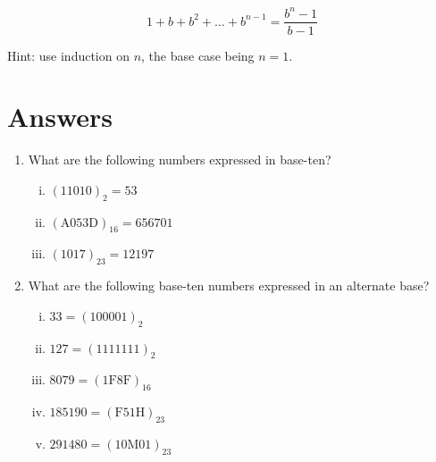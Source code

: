 \documentclass{article}
\begin{document}
\begin{enumerate}
\[1+b+b^2+\dots+b^{n-1} = \frac{b^n-1}{b-1}\]

Hint: use induction on $n$, the base case being $n=1$.

\end{enumerate}

\section*{Answers}
\begin{enumerate}
\item What are the following numbers expressed in base-ten?
\begin{enumerate}[i)]
\item $(11010)_2 = 53$
\item $(\text{A}053\text{D})_{16}=656701$
\item $(1017)_{23} = 12197$
\end{enumerate}
\item What are the following base-ten numbers expressed in an alternate base?
\begin{enumerate}[i)]
\item $33 = (100001)_2$
\item $127 = (1111111)_2$
\item $8079 = (1\text{F}8\text{F})_{16}$
\item $185190 = (\text{F}51\text{H})_{23}$
\item $291480 = (10\text{M}01)_{23}$
\end{enumerate}
\end{enumerate}
\end{document}
